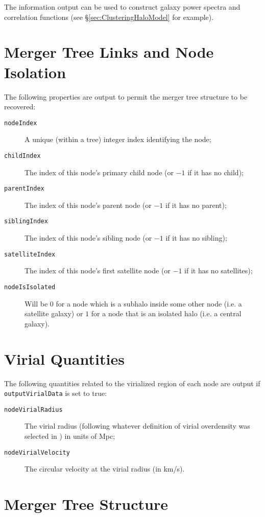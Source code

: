 The information output can be used to construct galaxy power spectra and correlation functions (see \S\ref{sec:ClusteringHaloModel} for example).

\section{Merger Tree Links and Node Isolation}

The following properties are output to permit the merger tree structure to be recovered:
\begin{description}
 \item [{\tt nodeIndex}] A unique (within a tree) integer index identifying the node;
 \item [{\tt childIndex}] The index of this node's primary child node (or $-1$ if it has no child);
 \item [{\tt parentIndex}] The index of this node's parent node (or $-1$ if it has no parent);
 \item [{\tt siblingIndex}] The index of this node's sibling node (or $-1$ if it has no sibling);
 \item [{\tt satelliteIndex}] The index of this node's first satellite node (or $-1$ if it has no satellites);
 \item [{\tt nodeIsIsolated}] Will be $0$ for a node which is a subhalo inside some other node (i.e. a satellite galaxy) or $1$ for a node that is an isolated halo (i.e. a central galaxy).
\end{description}

\section{Virial Quantities}

The following quantities related to the virialized region of each node are output if {\tt outputVirialData} is set to true:
\begin{description}
 \item [{\tt nodeVirialRadius}] The virial radius (following whatever definition of virial overdensity was selected in \glc) in units of Mpc;
 \item [{\tt nodeVirialVelocity}] The circular velocity at the virial radius (in km/s).
\end{description}

\section{Merger Tree Structure}

